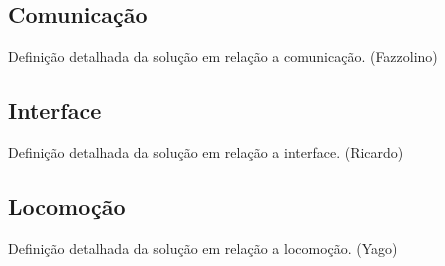 \subsection{Comunicação} %
\label{sub:comunicação}
	Definição detalhada da solução em relação a comunicação. (Fazzolino)

\subsection{Interface} %
\label{sub:interface}
	Definição detalhada da solução em relação a interface. (Ricardo)

\subsection{Locomoção} %
\label{sub:locomoção}
	Definição detalhada da solução em relação a locomoção. (Yago)
